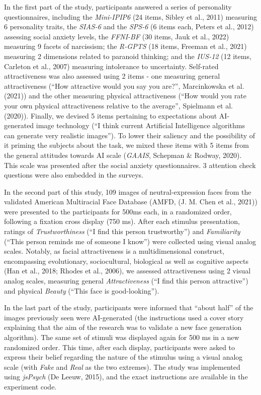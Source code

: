 \documentclass[
  man,mask,floatsintext]{apa6}
\begin{document}
In the first part of the study, participants answered a series of personality questionnaires, including the \emph{Mini-IPIP6} (24 items, Sibley et al., 2011) measuring 6 personality traits, the \emph{SIAS-6} and the \emph{SPS-6} (6 items each, Peters et al., 2012) assessing social anxiety levels, the \emph{FFNI-BF} (30 items, Jauk et al., 2022) measuring 9 facets of narcissism; the \emph{R-GPTS} (18 items, Freeman et al., 2021) measuring 2 dimensions related to paranoid thinking; and the \emph{IUS-12} (12 items, Carleton et al., 2007) measuring intolerance to uncertainty. Self-rated attractiveness was also assessed using 2 items - one measuring general attractiveness (``How attractive would you say you are?'', Marcinkowska et al. (2021)) and the other measuring physical attractiveness (``How would you rate your own physical attractiveness relative to the average'', Spielmann et al. (2020)). Finally, we devised 5 items pertaining to expectations about AI-generated image technology (``I think current Artificial Intelligence algorithms can generate very realistic images''). To lower their saliency and the possibility of it priming the subjects about the task, we mixed these items with 5 items from the general attitudes towards AI scale (\emph{GAAIS}, Schepman \& Rodway, 2020). This scale was presented after the social anxiety questionnaires. 3 attention check questions were also embedded in the surveys.

In the second part of this study, 109 images of neutral-expression faces from the validated American Multiracial Face Database (AMFD, (J. M. Chen et al., 2021)) were presented to the participants for 500ms each, in a randomized order, following a fixation cross display (750 ms). After each stimulus presentation, ratings of \emph{Trustworthiness} (``I find this person trustworthy'') and \emph{Familiarity} (``This person reminds me of someone I know'') were collected using visual analog scales. Notably, as facial attractiveness is a multidimensional construct, encompassing evolutionary, sociocultural, biological as well as cognitive aspects (Han et al., 2018; Rhodes et al., 2006), we assessed attractiveness using 2 visual analog scales, measuring general \emph{Attractiveness} (``I find this person attractive'') and physical \emph{Beauty} (``This face is good-looking'').

In the last part of the study, participants were informed that ``about half'' of the images previously seen were AI-generated (the instructions used a cover story explaining that the aim of the research was to validate a new face generation algorithm). The same set of stimuli was displayed again for 500 ms in a new randomized order. This time, after each display, participants were asked to express their belief regarding the nature of the stimulus using a visual analog scale (with \emph{Fake} and \emph{Real} as the two extremes). The study was implemented using \emph{jsPsych} (De Leeuw, 2015), and the exact instructions are available in the experiment code.
\end{document}
